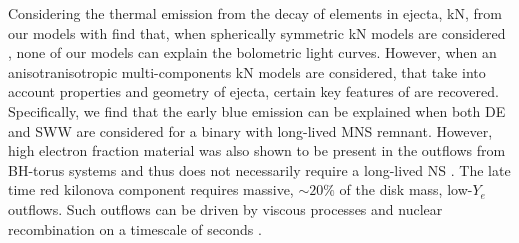 Considering the thermal emission from the decay of \rproc{} elements in ejecta, \ac{kN}, 
from our models with find that, when spherically symmetric \ac{kN} models are 
considered \citep{Villar:2017wcc}, none of our models can explain 
the \AT{} bolometric light curves.
However, when an anisotranisotropic multi-components \ac{kN} models are considered, 
that take into account properties and geometry of ejecta, 
certain key features of \AT{} are recovered.
Specifically, we find that the early blue emission can be explained 
when both \ac{DE} and \ac{SWW} are considered for a binary with long-lived \ac{MNS} remnant.
However, high electron fraction material was also shown to be present in the outflows 
from \ac{BH}-torus systems and thus does not necessarily require a long-lived \ac{NS} 
\citep{Fujibayashi:2020qda}.
The late time red kilonova component requires massive, ${\sim}20\%$ of the disk mass, 
low-$Y_e$ outflows. Such outflows can be driven by viscous processes and nuclear recombination 
on a timescale of seconds \citep[\eg][]{Metzger:2008av}.
%

